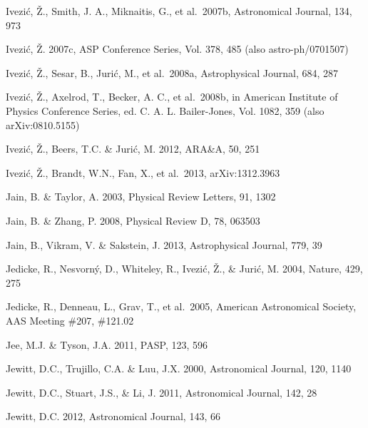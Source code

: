 \documentclass[twocolumn]{aastex61}
\begin{document}
\begin{thebibliography}{}
 Ivezi\'{c}, \v{Z}., Smith, J. A., Miknaitis, G., et al.~2007b, Astronomical Journal, 134, 973

 Ivezi\'{c}, \v{Z}. 2007c, ASP Conference Series, Vol. 378, 485 (also astro-ph/0701507)

 Ivezi\'c, \v Z., Sesar, B., Juri\'{c}, M., et al.~2008a, Astrophysical Journal, 684, 287

 Ivezi\'c, \v Z., Axelrod, T., Becker, A. C., et al.~2008b, in American Institute of Physics Conference Series, ed. C. A. L. Bailer-Jones, Vol. 1082, 359 (also arXiv:0810.5155)

 Ivezi\'c, \v Z., Beers, T.C. \& Juri\'{c}, M. 2012, ARA\&A, 50, 251

 Ivezi\'c, \v Z., Brandt, W.N., Fan, X., et al.~2013, arXiv:1312.3963

 Jain, B. \& Taylor, A. 2003, Physical Review Letters, 91, 1302

 Jain, B. \& Zhang, P. 2008, Physical Review D, 78, 063503

 Jain, B., Vikram, V. \& Sakstein, J. 2013, Astrophysical Journal, 779, 39

 Jedicke, R., Nesvorn{\'y}, D., Whiteley, R., Ivezi{\'c}, {\v Z}., \& Juri{\'c}, M. 2004, Nature, 429, 275

 Jedicke, R., Denneau, L., Grav, T., et al.~2005, American Astronomical Society, AAS Meeting \#207, \#121.02

 Jee, M.J. \& Tyson, J.A. 2011, PASP, 123, 596

 Jewitt, D.C., Trujillo, C.A. \& Luu, J.X. 2000, Astronomical Journal, 120, 1140

 Jewitt, D.C., Stuart, J.S., \& Li, J. 2011, Astronomical Journal, 142, 28

 Jewitt, D.C. 2012, Astronomical Journal, 143, 66


\end{thebibliography}
\end{document}
